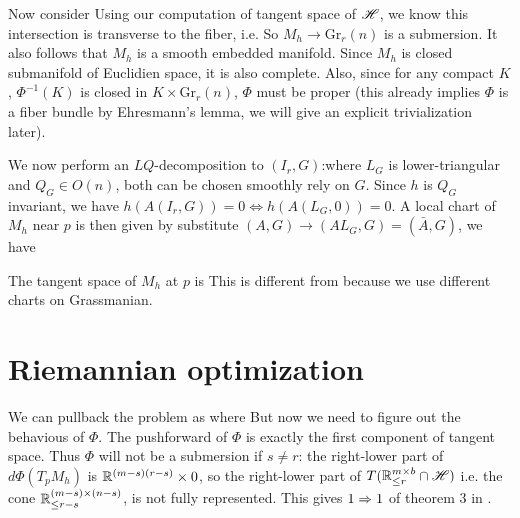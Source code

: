 \documentclass[]{note}
\begin{document}
Now consider 
Using our computation of tangent space of $\mathscr H$, we know this intersection is transverse to the fiber, i.e. So $M_h \to\mathrm{Gr}_r(n)$ is a submersion. It also follows that $M_h$ is a smooth embedded manifold. Since $M_h$ is closed submanifold of Euclidien space, it is also complete. Also, since for any compact $K$, $\Phi^{-1}(K)$ is closed in $K\times \mathrm{Gr}_r(n)$, $\Phi$ must be proper (this already implies $\Phi$ is a fiber bundle by Ehresmann's lemma, we will give an explicit trivialization later). 

We now perform an $LQ$-decomposition to $(I_r,G)$:where $L_G$ is lower-triangular and $Q_G\in O(n)$, both can be chosen smoothly rely on $G$. Since $h$ is $Q_G$ invariant, we have $h(A(I_r,G))=0\iff h(A(L_G,0))=0 $.
 A local chart of $M_h$ near $p$ is then given by substitute $(A,G)\to (AL_G,G)=(\bar A,G)$, we have

The tangent space of $M_h$ at $p$ is 
This is different from \cite{pap} because we use different charts on Grassmanian.

\section{Riemannian optimization}
We can pullback the problem as 
where 
But now we need to figure out the behavious of $\Phi$.
The pushforward of $\Phi$ is exactly the first component of tangent space. Thus $\Phi$ will not be a submersion if $s\neq r$: the right-lower part of $d\Phi(T_pM_h)$ is $\mathbb{R}^{(m-s)(r-s)}\times 0$, so the right-lower part of $T(\mathbb{R}^{m\times b}_{\le r}\cap\mathscr H)$ i.e. the cone $\mathbb{R}^{(m-s)\times (n-s)}_{\le r-s}$, is not fully represented. This gives $1\Rightarrow 1$ of theorem 3 in \cite{pap}.
\end{document}

